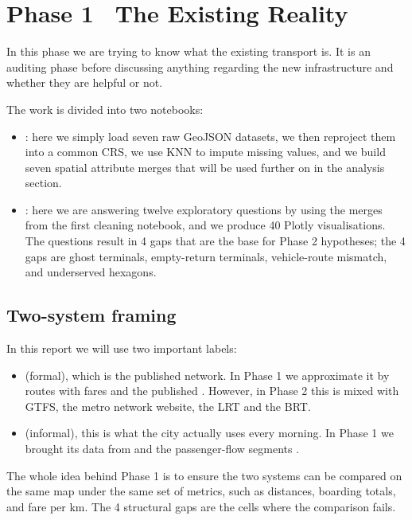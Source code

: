 
\section{Phase 1 \textbullet\ The Existing Reality}
\label{sec:phase1-intro}

In this phase we are trying to know what the existing transport is.
It is an auditing phase before discussing anything regarding the new
infrastructure and whether they are helpful or not.

The work is divided into two notebooks:

\begin{itemize}
  \item {}: here we simply load seven raw
        GeoJSON datasets, we then reproject them into a common CRS,
        we use KNN to impute missing values, and we build seven
        spatial attribute merges that will be used further on in the
        analysis section.
  \item {}: here we are answering twelve
        exploratory questions by using the merges from the first
        cleaning notebook, and we produce 40 Plotly visualisations.
        The questions result in 4 gaps that are the base for Phase 2
        hypotheses; the 4 gaps are ghost terminals, empty-return
        terminals, vehicle-route mismatch, and underserved hexagons.
\end{itemize}

\subsection{Two-system framing}

In this report we will use two important labels:

\begin{itemize}
  \item {} (formal), which is the published network. In
        Phase 1 we approximate it by routes with fares and the
        published . However, in
        Phase 2 this is mixed with GTFS, the metro network website,
        the LRT and the BRT.
  \item {} (informal), this is what the city actually uses
        every morning. In Phase 1 we brought its data from
         and the passenger-flow segments
        .
\end{itemize}

The whole idea behind Phase 1 is to ensure the two systems can be
compared on the same map under the same set of metrics, such as
distances, boarding totals, and fare per km. The 4 structural gaps are
the cells where the comparison fails.
